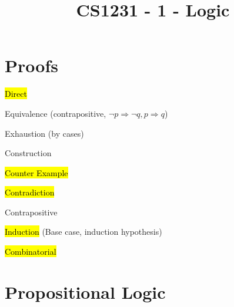 \documentclass[12pt]{article}
\title{\textbf{CS1231 - 1 - Logic}}
\date{}
\begin{document}
\maketitle
\begin{spacing}{1.5}

\section{Proofs}

\begin{itemize*}
	\item \hl{Direct}
	\item Equivalence (contrapositive, $\neg p \Rightarrow \neg q, p \Rightarrow q$)
	\item Exhaustion (by cases)
	\item Construction
	\item \hl{Counter Example}
	\item \hl{Contradiction}
	\item Contrapositive
	\item \hl{Induction} (Base case, induction hypothesis)
	\item \hl{Combinatorial}
\end{itemize*}

\section{Propositional Logic}


\end{spacing}
\end{document}
